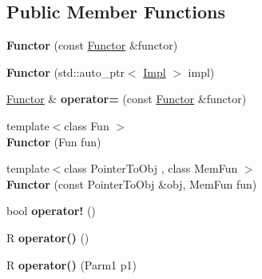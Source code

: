 \subsection*{Public Member Functions}
\begin{DoxyCompactItemize}
\item 
\hypertarget{classutilspp_1_1Functor_abf122492569cda6af15291161b126231}{{\bfseries Functor} (const \hyperlink{classutilspp_1_1Functor}{Functor} \&functor)}\label{classutilspp_1_1Functor_abf122492569cda6af15291161b126231}

\item 
\hypertarget{classutilspp_1_1Functor_a22717724866552dd02dac01a98c09d32}{{\bfseries Functor} (std\-::auto\-\_\-ptr$<$ \hyperlink{structutilspp_1_1FunctorImpl}{Impl} $>$ impl)}\label{classutilspp_1_1Functor_a22717724866552dd02dac01a98c09d32}

\item 
\hypertarget{classutilspp_1_1Functor_a4f711f224934efa997c1fb4891a7f3a1}{\hyperlink{classutilspp_1_1Functor}{Functor} \& {\bfseries operator=} (const \hyperlink{classutilspp_1_1Functor}{Functor} \&functor)}\label{classutilspp_1_1Functor_a4f711f224934efa997c1fb4891a7f3a1}

\item 
\hypertarget{classutilspp_1_1Functor_ad3cb9001426794b33ae05f6cf3cdc512}{{\footnotesize template$<$class Fun $>$ }\\{\bfseries Functor} (Fun fun)}\label{classutilspp_1_1Functor_ad3cb9001426794b33ae05f6cf3cdc512}

\item 
\hypertarget{classutilspp_1_1Functor_a55a2998649d016f9e25f445052b02286}{{\footnotesize template$<$class Pointer\-To\-Obj , class Mem\-Fun $>$ }\\{\bfseries Functor} (const Pointer\-To\-Obj \&obj, Mem\-Fun fun)}\label{classutilspp_1_1Functor_a55a2998649d016f9e25f445052b02286}

\item 
\hypertarget{classutilspp_1_1Functor_a5d481f1869bd55882e87b0c4e648ee5f}{bool {\bfseries operator!} ()}\label{classutilspp_1_1Functor_a5d481f1869bd55882e87b0c4e648ee5f}

\item 
\hypertarget{classutilspp_1_1Functor_a446508160326c6258a84d154669f66f9}{R {\bfseries operator()} ()}\label{classutilspp_1_1Functor_a446508160326c6258a84d154669f66f9}

\item 
\hypertarget{classutilspp_1_1Functor_a3f32c90ebea10b1effacb09f4b690999}{R {\bfseries operator()} (Parm1 p1)}\label{classutilspp_1_1Functor_a3f32c90ebea10b1effacb09f4b690999}


\end{DoxyCompactItemize}
